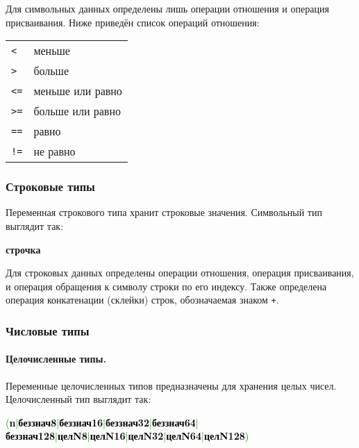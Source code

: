 \documentclass[10pt]{report}
\begin{document}
Для символьных данных определены лишь операции отношения и операция присваивания. Ниже приведён список операций отношения:

\begin{tabular}{ll}
 \texttt{<}         & меньше                                        \\
 \texttt{>}         & больше                                        \\
 \texttt{<=}        & меньше или равно                              \\
 \texttt{>=}        & больше или равно                              \\
 \texttt{==}        & равно                                         \\
 \texttt{!=}        & не равно                                      \\
\end{tabular}

        \subsubsection{Строковые типы}
Переменная строкового типа хранит строковые значения. Символьный тип выглядит так:
\begin{center}
\noindent\textbf{строчка}
\end{center}

Для строковых данных определены операции отношения, операция присваивания, и операция обращения к символу строки по его индексу. Также определена операция конкатенации (склейки) строк, обозначаемая знаком \glqq\texttt{+}\grqq.

        \subsubsection{Числовые типы}
            \paragraph{Целочисленные типы.}Переменные целочисленных типов предназначены для хранения целых чисел. Целочисленный тип выглядит так:
\begin{center}
\noindent\textcolor{Green}{(\textcolor{Black}{\textbf{n}}|\textcolor{Black}{\textbf{беззнач8}}|\textcolor{Black}{\textbf{беззнач16}}|\textcolor{Black}{\textbf{беззнач32}}|\textcolor{Black}{\textbf{беззнач64}}|\\
\textcolor{Black}{\textbf{беззнач128}}|\textcolor{Black}{\textbf{целN8}}|\textcolor{Black}{\textbf{целN16}}|\textcolor{Black}{\textbf{целN32}}|\textcolor{Black}{\textbf{целN64}}|\textcolor{Black}{\textbf{целN128}})}
\end{center}
\end{document}
